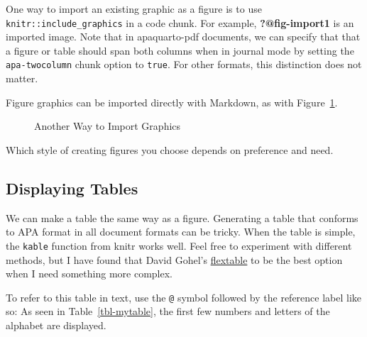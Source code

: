 \documentclass[
  letterpaper,
  DIV=11,
  numbers=noendperiod,
  oneside]{scrartcl}
\begin{document}
One way to import an existing graphic as a figure is to use
\texttt{knitr::include\_graphics} in a code chunk. For example,
\textbf{?@fig-import1} is an imported image. Note that in apaquarto-pdf
documents, we can specify that that a figure or table should span both
columns when in journal mode by setting the \texttt{apa-twocolumn} chunk
option to \texttt{true}. For other formats, this distinction does not
matter.

Figure graphics can be imported directly with Markdown, as with
Figure~\ref{fig-import2}.

\begin{figure}


\caption{\label{fig-import2}Another Way to Import Graphics}

\end{figure}%

Which style of creating figures you choose depends on preference and
need.

\subsection{Displaying Tables}\label{displaying-tables}

We can make a table the same way as a figure. Generating a table that
conforms to APA format in all document formats can be tricky. When the
table is simple, the \texttt{kable} function from knitr works well. Feel
free to experiment with different methods, but I have found that David
Gohel's \href{https://davidgohel.github.io/flextable/}{flextable} to be
the best option when I need something more complex.

To refer to this table in text, use the \texttt{@} symbol followed by
the reference label like so: As seen in Table~\ref{tbl-mytable}, the
first few numbers and letters of the alphabet are displayed.
\end{document}
